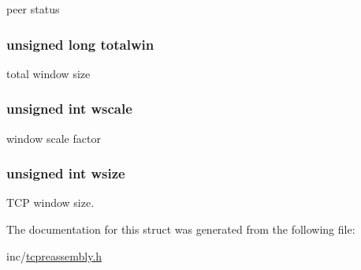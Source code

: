 peer status 

\hypertarget{structntoh__tcp__peer__t_af40364d83cae85562184a8bee797ae6c}{
\subsubsection[{totalwin}]{\setlength{\rightskip}{0pt plus 5cm}unsigned long totalwin}}\label{structntoh__tcp__peer__t_af40364d83cae85562184a8bee797ae6c}


total window size 

\hypertarget{structntoh__tcp__peer__t_a648feb18271d5c1fe600c6bf7875478c}{
\subsubsection[{wscale}]{\setlength{\rightskip}{0pt plus 5cm}unsigned int wscale}}\label{structntoh__tcp__peer__t_a648feb18271d5c1fe600c6bf7875478c}


window scale factor 

\hypertarget{structntoh__tcp__peer__t_a2e4250265d88bafcbc4bdad73639c2a7}{
\subsubsection[{wsize}]{\setlength{\rightskip}{0pt plus 5cm}unsigned int wsize}}\label{structntoh__tcp__peer__t_a2e4250265d88bafcbc4bdad73639c2a7}


T\-C\-P window size. 



The documentation for this struct was generated from the following file\-:\begin{DoxyCompactItemize}
\item 
inc/\hyperlink{tcpreassembly_8h}{tcpreassembly.\-h}\end{DoxyCompactItemize}
